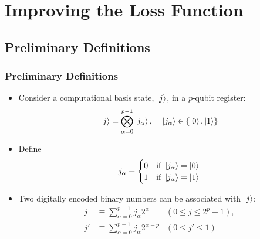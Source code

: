 \documentclass{beamer}
\begin{document}
\section{Improving the Loss Function}

\subsection{Preliminary Definitions}

\begin{frame}
\frametitle{Preliminary Definitions}
\begin{itemize}
\item Consider a \alert{computational basis state}, $\ket{j}$, in a $p$-qubit register:
\begin{equation}
\ket{j} = \bigotimes^{p-1}_{\alpha=0} \ket{j_\alpha}, \; \; \; \; \ket{j_\alpha} \in \{\ket{0},\ket{1} \}
\end{equation}
\item Define 
\begin{equation}
j_\alpha \equiv \begin{cases}
0 & \text{if } \ket{j_\alpha}=\ket{0} \\
1 & \text{if }  \ket{j_\alpha}=\ket{1} \\
\end{cases}
\end{equation}
\item Two \alert{digitally encoded binary numbers} can be associated with $\ket{j}$:
\begin{align}
j &\equiv \sum_{\alpha=0}^{p-1} j_\alpha 2^{\alpha} &(0 \leq j \leq 2^p-1 ), \\
j' &\equiv \sum_{\alpha=0}^{p-1} j_\alpha 2^{\alpha-p} &(0 \leq j' \leq 1)
\end{align}
\end{itemize}
\end{frame}
\end{document}

